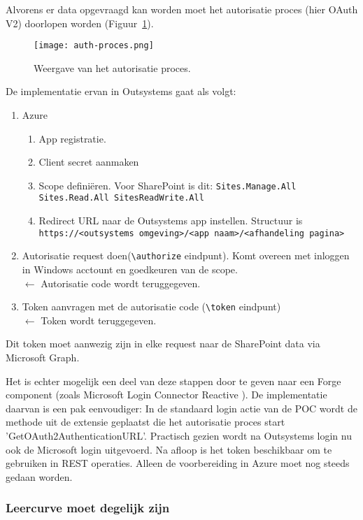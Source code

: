 Alvorens er data opgevraagd kan worden moet het autorisatie proces (hier OAuth V2) doorlopen worden (Figuur~\ref{fig:auth-proces}).

\begin{figure}[h!]
    \centering
    \texttt{[image: auth-proces.png]}
    \caption{Weergave van het autorisatie proces. \autocite{MSLCT2019}}
    \label{fig:auth-proces}
\end{figure}

De implementatie ervan in Outsystems gaat als volgt:
\begin{enumerate}
    \item Azure
    \begin{enumerate}
        \item App registratie.
        \item Client secret aanmaken
        \item Scope definiëren. Voor SharePoint is dit: \lstinline|Sites.Manage.All Sites.Read.All SitesReadWrite.All|
        \item Redirect URL naar de Outsystems app instellen. Structuur is \lstinline|https://<outsystems omgeving>/<app naam>/<afhandeling pagina>| 
    \end{enumerate}
    \item Autorisatie request doen(\lstinline|\authorize| eindpunt). Komt overeen met inloggen in Windows acctount en goedkeuren van de scope.\\
    $\leftarrow$ Autorisatie code wordt teruggegeven.
    \item Token aanvragen met de autorisatie code (\lstinline|\token| eindpunt)\\
    $\leftarrow$ Token wordt teruggegeven.
\end{enumerate}
Dit token moet aanwezig zijn in elke request naar de SharePoint data via Microsoft Graph.

Het is echter mogelijk een deel van deze stappen door te geven naar een Forge component (zoals Microsoft Login Connector Reactive \autocite{MSLCT2019}). De implementatie daarvan is een pak eenvoudiger: In de standaard login actie van de POC wordt de methode uit de extensie geplaatst die het autorisatie proces start 'GetOAuth2AuthenticationURL'. Practisch gezien wordt na Outsystems login nu ook de Microsoft login uitgevoerd. Na afloop is het token beschikbaar om te gebruiken in REST operaties. Alleen de voorbereiding in Azure moet nog steeds gedaan worden.

\subsubsection{Leercurve moet degelijk zijn}

